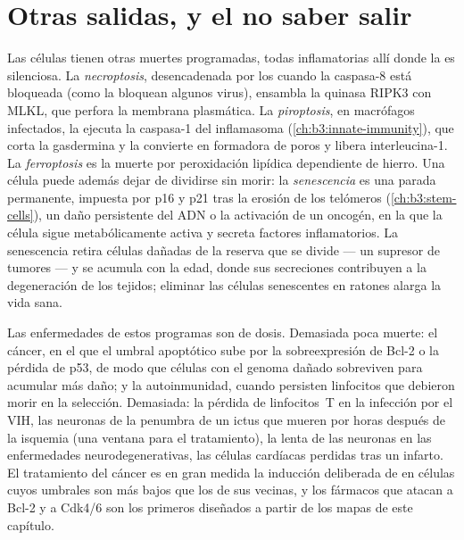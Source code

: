 \section{Otras salidas, y el no saber salir}

\begin{definition}\label{def:b3:cell-cycle-apoptosis:other}
Las células tienen otras muertes programadas, todas inflamatorias allí
donde la  es silenciosa. La \emph{necroptosis}, desencadenada
por los  cuando la caspasa-8 está bloqueada (como la
bloquean algunos virus), ensambla la quinasa RIPK3 con MLKL, que perfora
la membrana plasmática. La \emph{piroptosis}, en macrófagos infectados,
la ejecuta la caspasa-1 del inflamasoma (\cref{ch:b3:innate-immunity}),
que corta la gasdermina y la convierte en formadora de poros y libera
interleucina-1. La \emph{ferroptosis} es la muerte por peroxidación
lipídica dependiente de hierro. Una célula puede además dejar de
dividirse sin morir: la \emph{senescencia} es una parada permanente,
impuesta por p16 y p21 tras la erosión de los telómeros
(\cref{ch:b3:stem-cells}), un daño persistente del ADN o la activación de
un oncogén, en la que la célula sigue metabólicamente activa y secreta
factores inflamatorios. La senescencia retira células dañadas de la
reserva que se divide --- un supresor de tumores --- y se acumula con la
edad, donde sus secreciones contribuyen a la degeneración de los tejidos;
eliminar las células senescentes en ratones alarga la vida sana.
\end{definition}

\begin{remark}\label{rem:b3:cell-cycle-apoptosis:disease}
Las enfermedades de estos programas son de dosis. Demasiada poca muerte:
el cáncer, en el que el umbral apoptótico sube por la sobreexpresión de
Bcl-2 o la pérdida de p53, de modo que células con el genoma dañado
sobreviven para acumular más daño; y la autoinmunidad, cuando persisten
linfocitos que debieron morir en la selección. Demasiada: la pérdida de
linfocitos~T en la infección por el VIH, las neuronas de la penumbra de
un ictus que mueren por  horas después de la isquemia (una
ventana para el tratamiento), la  lenta de las neuronas en las
enfermedades neurodegenerativas, las células cardíacas perdidas tras un
infarto. El tratamiento del cáncer es en gran medida la inducción
deliberada de  en células cuyos umbrales son más bajos que los
de sus vecinas, y los fármacos que atacan a Bcl-2 y a Cdk4/6 son los
primeros diseñados a partir de los mapas de este capítulo.
\end{remark}

